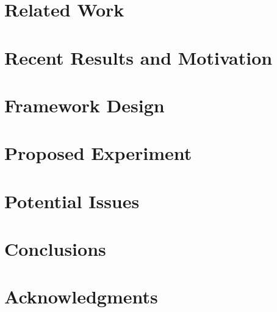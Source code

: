 \documentclass{sig-alternate}
\begin{document}
\section{Related Work}

\section{Recent Results and Motivation}

\section{Framework Design}

\section{Proposed Experiment}

\section{Potential Issues}

\section{Conclusions}


\section{Acknowledgments}

%


%
%
\end{document}
